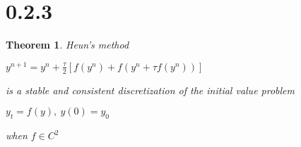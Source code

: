 \documentclass[a4paper]{amsproc}
\theoremstyle{plain}
\newtheorem*{thm}{Theorem}
\theoremstyle{definition}
\theoremstyle{remark}
\numberwithin{equation}{section}
\begin{document}
\section*{0.2.3}

\begin{thm}
 Heun's method 
 
 \begin{center}
 $ y^{n+1} = y^n + \frac{\tau}{2}[f(y^n) + f(y^n + \tau f(y^n))] $ 
 \end{center} 
 
 is a stable and consistent discretization of the initial value problem 
 
 \begin{center}
 $ y_t = f(y), ~ y(0) = y_0$ 
 \end{center}
 
 when $f \in C^2$
 
\end{thm}
\end{document}
